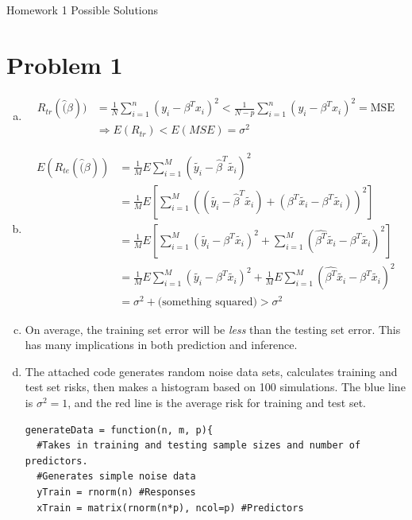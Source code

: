 \documentclass[12pt]{article}
\begin{document}
\begin{center}
Homework 1 Possible Solutions
\end{center}

\section*{Problem 1}
\begin{enumerate}[(a)]
\item \begin{align*}
	R_{tr} ( \hat(\beta ) ) &= \frac{1}{N} \sum_{i=1}^n \left( y_i - \beta^T x_i \right)^2 
			< \frac{1}{N-p} \sum_{i=1}^n \left( y_i - \beta^T x_i \right)^2 = \text{MSE} \\
			& \Rightarrow E(R_{tr}) < E(MSE) = \sigma^2
	\end{align*}
	
\item \begin{align*}
	E ( R_{te}( \hat(\beta ) ) &= 
	\frac{1}{M} E \sum_{i=1}^M \left( \tilde{y_i} - \hat{\beta}^T \tilde{x_i} \right)^2 \\
%
	&= \frac{1}{M} E \left[ \sum_{i=1}^M \left(  \left( \tilde{y_i} - \hat{\beta}^T \tilde{x_i} \right) + \left( \beta^T \tilde{x_i} - \beta^T \tilde{x_i} \right) \right)^2 \right] \\
%	
	&= \frac{1}{M} E \left[ \sum_{i=1}^M \left( \tilde{y_i} - \beta^T \tilde{x_i} \right)^2 + \sum_{i=1}^M \left( \hat{\beta^T} \tilde{x_i} - \beta^T \tilde{x_i} \right)^2 \right] \\
%
	&= \frac{1}{M} E \sum_{i=1}^M \left( \tilde{y_i} - \beta^T \tilde{x_i} \right)^2 +
	\frac{1}{M} E \sum_{i=1}^M \left( \hat{\beta^T} \tilde{x_i} - \beta^T \tilde{x_i} \right)^2 \\
%
	&= \sigma^2 + \text{(something squared)} > \sigma^2
\end{align*}
\item On average, the training set error will be \emph{less} than the testing set error. This has many implications in both prediction and inference.

\item The attached code generates random noise data sets, calculates training and test set risks, then makes a histogram based on 100 simulations. The blue line is $\sigma^2 = 1$, and the red line is the average risk for training and test set.
\begin{lstlisting}
generateData = function(n, m, p){
  #Takes in training and testing sample sizes and number of predictors.
  #Generates simple noise data
  yTrain = rnorm(n) #Responses
  xTrain = matrix(rnorm(n*p), ncol=p) #Predictors
  

\end{lstlisting}
\end{enumerate}
\end{document}
